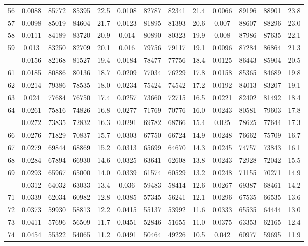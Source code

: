 \documentclass[
  14pt,
]{article}
\begin{document}
\begin{longtable}[t]{lcccccccccccc}
56 & 0.0088 & 85772 & 85395 & 22.5 & 0.0108 & 82787 & 82341 & 21.4 & 0.0066 & 89196 & 88901 & 23.8\\
57 & 0.0098 & 85019 & 84604 & 21.7 & 0.0123 & 81895 & 81393 & 20.6 & 0.007 & 88607 & 88296 & 23.0\\
58 & 0.0111 & 84189 & 83720 & 20.9 & 0.014 & 80890 & 80323 & 19.9 & 0.008 & 87986 & 87635 & 22.1\\
59 & 0.013 & 83250 & 82709 & 20.1 & 0.016 & 79756 & 79117 & 19.1 & 0.0096 & 87284 & 86864 & 21.3\\
\addlinespace
60 & 0.0156 & 82168 & 81527 & 19.4 & 0.0184 & 78477 & 77756 & 18.4 & 0.0125 & 86443 & 85904 & 20.5\\
61 & 0.0185 & 80886 & 80136 & 18.7 & 0.0209 & 77034 & 76229 & 17.8 & 0.0158 & 85365 & 84689 & 19.8\\
62 & 0.0214 & 79386 & 78535 & 18.0 & 0.0234 & 75424 & 74542 & 17.2 & 0.0192 & 84013 & 83207 & 19.1\\
63 & 0.024 & 77684 & 76750 & 17.4 & 0.0257 & 73660 & 72715 & 16.5 & 0.0221 & 82402 & 81492 & 18.4\\
64 & 0.0261 & 75816 & 74826 & 16.8 & 0.0277 & 71769 & 70776 & 16.0 & 0.0243 & 80581 & 79603 & 17.8\\
\addlinespace
65 & 0.0272 & 73835 & 72832 & 16.3 & 0.0291 & 69782 & 68766 & 15.4 & 0.025 & 78625 & 77644 & 17.3\\
66 & 0.0276 & 71829 & 70837 & 15.7 & 0.0303 & 67750 & 66724 & 14.9 & 0.0248 & 76662 & 75709 & 16.7\\
67 & 0.0279 & 69844 & 68869 & 15.2 & 0.0313 & 65699 & 64670 & 14.3 & 0.0245 & 74757 & 73843 & 16.1\\
68 & 0.0284 & 67894 & 66930 & 14.6 & 0.0325 & 63641 & 62608 & 13.8 & 0.0243 & 72928 & 72042 & 15.5\\
69 & 0.0293 & 65967 & 65000 & 14.0 & 0.0339 & 61574 & 60529 & 13.2 & 0.0248 & 71155 & 70271 & 14.9\\
\addlinespace
70 & 0.0312 & 64032 & 63033 & 13.4 & 0.036 & 59483 & 58414 & 12.6 & 0.0267 & 69387 & 68461 & 14.2\\
71 & 0.0339 & 62034 & 60982 & 12.8 & 0.0385 & 57345 & 56241 & 12.1 & 0.0296 & 67535 & 66535 & 13.6\\
72 & 0.0373 & 59930 & 58813 & 12.2 & 0.0415 & 55137 & 53992 & 11.6 & 0.0333 & 65535 & 64444 & 13.0\\
73 & 0.0411 & 57696 & 56509 & 11.7 & 0.0451 & 52846 & 51655 & 11.0 & 0.0375 & 63353 & 62165 & 12.4\\
74 & 0.0454 & 55322 & 54065 & 11.2 & 0.0491 & 50464 & 49226 & 10.5 & 0.042 & 60977 & 59695 & 11.9\\

\end{longtable}
\end{document}
